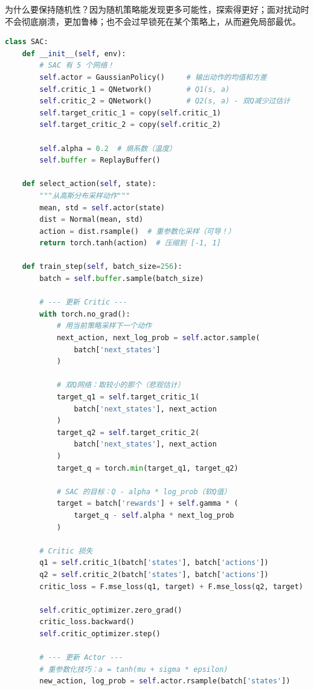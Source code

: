 为什么要保持随机性？因为随机策略能发现更多可能性，探索得更好；面对扰动时不会彻底崩溃，更加鲁棒；也不会过早锁死在某个策略上，从而避免局部最优。

\begin{lstlisting}[language=Python, caption={SAC 核心算法}]
class SAC:
    def __init__(self, env):
        # SAC 有 5 个网络！
        self.actor = GaussianPolicy()     # 输出动作的均值和方差
        self.critic_1 = QNetwork()        # Q1(s, a)
        self.critic_2 = QNetwork()        # Q2(s, a) - 双Q减少过估计
        self.target_critic_1 = copy(self.critic_1)
        self.target_critic_2 = copy(self.critic_2)
        
        self.alpha = 0.2  # 熵系数（温度）
        self.buffer = ReplayBuffer()
        
    def select_action(self, state):
        """从高斯分布采样动作"""
        mean, std = self.actor(state)
        dist = Normal(mean, std)
        action = dist.rsample()  # 重参数化采样（可导！）
        return torch.tanh(action)  # 压缩到 [-1, 1]
    
    def train_step(self, batch_size=256):
        batch = self.buffer.sample(batch_size)
        
        # --- 更新 Critic ---
        with torch.no_grad():
            # 用当前策略采样下一个动作
            next_action, next_log_prob = self.actor.sample(
                batch['next_states']
            )
            
            # 双Q网络：取较小的那个（悲观估计）
            target_q1 = self.target_critic_1(
                batch['next_states'], next_action
            )
            target_q2 = self.target_critic_2(
                batch['next_states'], next_action
            )
            target_q = torch.min(target_q1, target_q2)
            
            # SAC 的目标：Q - alpha * log_prob（软Q值）
            target = batch['rewards'] + self.gamma * (
                target_q - self.alpha * next_log_prob
            )
        
        # Critic 损失
        q1 = self.critic_1(batch['states'], batch['actions'])
        q2 = self.critic_2(batch['states'], batch['actions'])
        critic_loss = F.mse_loss(q1, target) + F.mse_loss(q2, target)
        
        self.critic_optimizer.zero_grad()
        critic_loss.backward()
        self.critic_optimizer.step()
        
        # --- 更新 Actor ---
        # 重参数化技巧：a = tanh(mu + sigma * epsilon)
        new_action, log_prob = self.actor.rsample(batch['states'])
        

\end{lstlisting}
